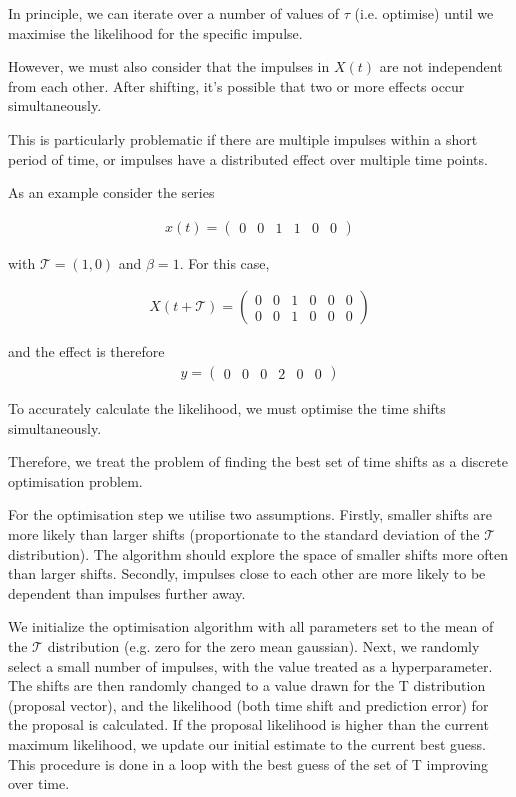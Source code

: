 \documentclass[11pt]{amsart}
\begin{document}
In principle, we can iterate over a number of values of $\tau$ (i.e. optimise) until we maximise the likelihood for the specific impulse.

However, we must also consider that the impulses in $X(t)$ are not independent from each other. After shifting, it's possible that two or more effects occur simultaneously.

This is particularly problematic if there are multiple impulses within a short period of time, or impulses have a distributed effect over multiple time points. 

As an example consider the series 

\begin{align}
x(t) = 
\left(
\begin{array}{cccccc}
0 & 0 & 1 & 1 & 0 & 0
\end{array}  
\right)
\end{align}

with $\mathcal{T}= (1, 0)$ and $\beta = 1$. For this case, 

\begin{align}
X(t + \mathcal{T}) = 
\left(
\begin{array}{cccccc}
0 & 0 & 1 & 0 & 0 & 0 \\
0 & 0 & 1 & 0 & 0 & 0 
\end{array}  
\right)
\end{align}

and the effect is therefore 
\begin{align}
y = 
\left(
\begin{array}{cccccc}
0 & 0 & 0 & 2 & 0 & 0
\end{array}  
\right)
\end{align}

To accurately calculate the likelihood, we must optimise the time shifts simultaneously.

Therefore, we treat the problem of finding the best set of time shifts as a discrete optimisation problem.

For the optimisation step we utilise two assumptions. Firstly, smaller shifts are more likely than larger shifts (proportionate to the standard deviation of the $\mathcal{T}$ distribution). The algorithm should explore the space of smaller shifts more often than larger shifts. Secondly, impulses close to each other are more likely to be dependent than impulses further away. 

We initialize the optimisation algorithm with all parameters set to the mean of the $\mathcal{T}$ distribution (e.g. zero for the zero mean gaussian). Next, we randomly select a small number of impulses, with the value treated as a hyperparameter. The shifts are then randomly changed to a value drawn for the T distribution (proposal vector), and the likelihood (both time shift and prediction error) for the proposal is calculated. If the proposal likelihood is higher than the current maximum likelihood, we update our initial estimate to the current best guess. This procedure is done in a loop with the best guess of the set of T improving over time.
\end{document}
